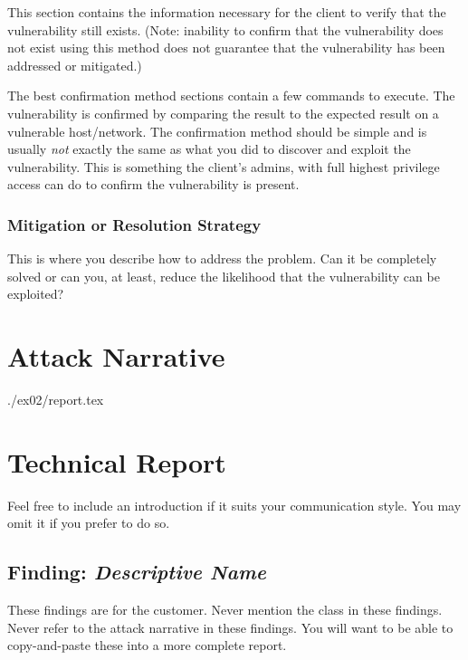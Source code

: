 		This section contains the information necessary for the
		client to verify that the vulnerability still exists.
		(Note: inability to confirm that the vulnerability
		does not exist using this method does not
		guarantee that the vulnerability has been addressed
		or mitigated.)
		
		The best confirmation method sections contain a few commands
		to execute. The vulnerability is confirmed by comparing
		the result to the expected result on a vulnerable
		host/network. The confirmation method should be simple
		and is usually \emph{not} exactly the same as what you
		did to discover and exploit the vulnerability.
		This is something the client's admins, with full
		highest privilege access can do to confirm the
		vulnerability is present.
		
    \subsubsection*{Mitigation or Resolution Strategy}
    
    	This is where you describe how to address the problem.
    	Can it be completely solved or can you, at least, reduce the
    	likelihood that the vulnerability can be exploited?
		



\section{Attack Narrative}
./ex02/report.tex

\section{Technical Report}

Feel free to include an introduction if it suits your communication style.
You may omit it if you prefer to do so.


  \subsection{Finding: \emph{Descriptive Name}}
  
    These findings are for the customer.
    Never mention the class in these findings.
    Never refer to the attack narrative in these findings.
    You will want to be able to copy-and-paste these into a more complete report.

